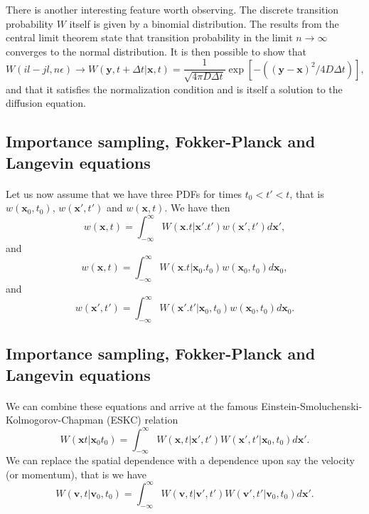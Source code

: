 \documentclass[%
twoside,                 %
final,                   %
10pt]{article}
\begin{document}
There is another interesting feature worth observing. The discrete transition probability $W$
itself is given by a binomial distribution.
The results from the central limit theorem state that 
transition probability in the limit $n\rightarrow \infty$ converges to the normal 
distribution. It is then possible to show that
\[
    W(il-jl,n\epsilon)\rightarrow W(\mathbf{y},t+\Delta t|\mathbf{x},t)=
    \frac{1}{\sqrt{4\pi D\Delta t}}\exp{\left[-((\mathbf{y}-\mathbf{x})^2/4D\Delta t)\right]},
\]
and that it satisfies the normalization condition and is itself a solution
to the diffusion equation.




\subsection*{Importance sampling, Fokker-Planck and Langevin equations}

\paragraph{}
Let us now assume that we have three PDFs for times $t_0 < t' < t$, that is
$w(\mathbf{x}_0,t_0)$, $w(\mathbf{x}',t')$ and $w(\mathbf{x},t)$.
We have then  
\[
   w(\mathbf{x},t)= \int_{-\infty}^{\infty} W(\mathbf{x}.t|\mathbf{x}'.t')w(\mathbf{x}',t')d\mathbf{x}',
\]
and
\[
   w(\mathbf{x},t)= \int_{-\infty}^{\infty} W(\mathbf{x}.t|\mathbf{x}_0.t_0)w(\mathbf{x}_0,t_0)d\mathbf{x}_0,
\]
and
\[
   w(\mathbf{x}',t')= \int_{-\infty}^{\infty} W(\mathbf{x}'.t'|\mathbf{x}_0,t_0)w(\mathbf{x}_0,t_0)d\mathbf{x}_0.
\]




\subsection*{Importance sampling, Fokker-Planck and Langevin equations}

\paragraph{}
We can combine these equations and arrive at the famous Einstein-Smoluchenski-Kolmogorov-Chapman (ESKC) relation
\[
 W(\mathbf{x}t|\mathbf{x}_0t_0)  = \int_{-\infty}^{\infty} W(\mathbf{x},t|\mathbf{x}',t')W(\mathbf{x}',t'|\mathbf{x}_0,t_0)d\mathbf{x}'.
\]
We can replace the spatial dependence with a dependence upon say the velocity
(or momentum), that is we have
\[
 W(\mathbf{v},t|\mathbf{v}_0,t_0)  = \int_{-\infty}^{\infty} W(\mathbf{v},t|\mathbf{v}',t')W(\mathbf{v}',t'|\mathbf{v}_0,t_0)d\mathbf{x}'.
\]
\end{document}
